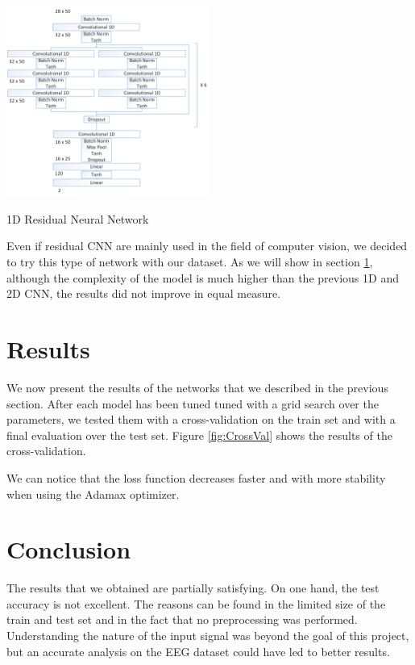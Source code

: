 \documentclass[10pt,conference,compsocconf]{IEEEtran}
\begin{document}

\begin{center}
	\captionsetup{type=figure}
	\includegraphics[width=0.5\textwidth]{img/Residual1D.png}
	\caption {1D Residual Neural Network}
	\label{fig:Residual}
\end{center}

Even if residual CNN are mainly used in the field of computer vision, we decided to try this type of network with our dataset. As we will show in section \ref{sec:results}, although the complexity of the model is much higher than the previous 1D and 2D CNN, the results did not improve in equal measure.

\section{Results}
\label{sec:results}
We now present the results of the networks that we described in the previous section. After each model has been tuned tuned with a grid search over the parameters, we tested them with a cross-validation on the train set and with a final evaluation over the test set. Figure \ref{fig:CrossVal} shows the results of the cross-validation.

We can notice that the loss function decreases faster and with more stability when using the Adamax optimizer.

\section{Conclusion}
\label{sec:conclusion}
The results that we obtained are partially satisfying. On one hand, the test accuracy is not excellent. The reasons can be found in the limited size of the train and test set and in the fact that no preprocessing was performed. Understanding the nature of the input signal was beyond the goal of this project, but an accurate analysis on the EEG dataset could have led to better results.
\end{document}
